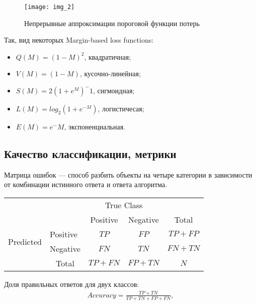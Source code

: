 \documentclass[12pt]{article}
\begin{document}
	\newpage
	
	\begin{figure}[!ht]
		\centering
		\texttt{[image: img\_2]}
		\caption{Непрерывные аппроксимации пороговой функции потерь}
		\label{1}
	\end{figure}
	
	Так, вид некоторых Margin-based loss functions:
	
		\begin{itemize}
		\item $Q(M) = (1-M)^2$, квадратичная;
		\item $V(M) = (1-M)$, кусочно-линейная;
		\item $S(M) = 2(1+e^M)^-1$, сигмоидная;
		\item $L(M) = log_2 (1+e^{-M})$, логистичесая;
		\item $E(M) = e^-M$, экспоненциальная.
	\end{itemize} 
	
	\subsection{Качество классификации, метрики}
	
	Матрица ошибок --- способ разбить объекты на четыре категории в зависимости	от комбинации истинного ответа и ответа алгоритма.
	
	\vspace{0.5cm}
	
	\begin{tabular}{l|l|c|c|c}
		\multicolumn{2}{c}{}&\multicolumn{2}{c}{True Class}&\\
		\cline{3-4}
		\multicolumn{2}{c|}{}&Positive&Negative&\multicolumn{1}{c}{Total}\\
		\cline{2-4}
		\multirow{2}{*}{Predicted}& Positive & $TP$ & $FP$ & $TP + FP$\\
		\cline{2-4}
		& Negative & $FN$ & $TN$ & $FN + TN$\\
		\cline{2-4}
		\multicolumn{1}{c}{} & \multicolumn{1}{c}{Total} & \multicolumn{1}{c}{$TP + FN$} & \multicolumn{    1}{c}{$FP + TN$} & \multicolumn{1}{c}{$N$}\\
	\end{tabular}

	\vspace{0.5cm}
	
	Доля правильных ответов для двух классов:
	\begin{eqnarray}\label{Accuracy}  
		Accuracy = \frac{TP + TN}{TP + TN + FP + FN}, 
	\end{eqnarray}
\end{document}
